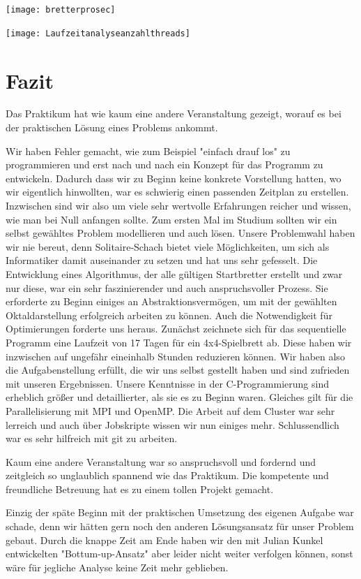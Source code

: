 \documentclass[
	12pt,
	a4paper,
	BCOR10mm,
	DIV14,
	listof=totoc,
	bibliography=totoc,
	headsepline
]{scrreprt}
\begin{document}
\texttt{[image: bretterprosec]}

\texttt{[image: Laufzeitanalyseanzahlthreads]}




\chapter{Fazit}
\label{Fazit}


Das Praktikum hat wie kaum eine andere Veranstaltung gezeigt, worauf es bei der praktischen Lösung eines Problems ankommt.

Wir haben Fehler gemacht, wie zum Beispiel "einfach drauf los" zu programmieren und erst nach und nach ein Konzept für das Programm zu entwickeln. Dadurch dass wir zu Beginn keine konkrete Vorstellung hatten, wo wir eigentlich hinwollten, war es schwierig einen passenden Zeitplan zu erstellen. 
Inzwischen sind wir also um viele sehr wertvolle Erfahrungen reicher und wissen, wie man bei Null anfangen sollte. 
Zum ersten Mal im Studium sollten wir ein selbst gewähltes Problem modellieren und auch lösen.
Unsere Problemwahl haben wir nie bereut, denn Solitaire-Schach bietet viele Möglichkeiten, um sich als Informatiker damit auseinander zu setzen und hat uns sehr gefesselt.
Die Entwicklung eines Algorithmus, der alle gültigen Startbretter erstellt und zwar nur diese, war ein sehr faszinierender und auch anspruchsvoller Prozess. Sie erforderte zu Beginn einiges an Abstraktionsvermögen, um mit der gewählten Oktaldarstellung erfolgreich arbeiten zu können.
Auch die Notwendigkeit für Optimierungen forderte uns heraus. Zunächst zeichnete sich für das sequentielle Programm eine Laufzeit von 17 Tagen für ein 4x4-Spielbrett ab. 
Diese haben wir inzwischen auf ungefähr eineinhalb Stunden reduzieren können. 
Wir haben also die Aufgabenstellung erfüllt, die wir uns selbst gestellt haben und sind zufrieden mit unseren Ergebnissen.
Unsere Kenntnisse in der C-Programmierung sind erheblich größer und detaillierter, als sie es zu Beginn waren. Gleiches gilt für die Parallelisierung mit MPI und OpenMP.
Die Arbeit auf dem Cluster war sehr lerreich und auch über Jobskripte wissen wir nun einiges mehr. Schlussendlich war es sehr hilfreich mit git zu arbeiten.

Kaum eine andere Veranstaltung war so anspruchsvoll und fordernd und zeitgleich so unglaublich spannend wie das Praktikum.
Die kompetente und freundliche Betreuung hat es zu einem tollen Projekt gemacht.

Einzig der späte Beginn mit der praktischen Umsetzung des eigenen Aufgabe war schade, denn wir hätten gern noch den anderen Lösungsansatz für unser Problem gebaut.
Durch die knappe Zeit am Ende haben wir den mit Julian Kunkel entwickelten "Bottum-up-Ansatz" aber leider nicht weiter verfolgen können, sonst wäre für jegliche Analyse keine Zeit mehr geblieben.
 
\end{document}
